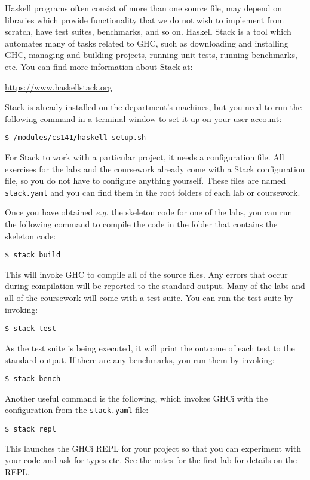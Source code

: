 Haskell programs often consist of more than one source file, may depend on libraries which provide functionality that we do not wish to implement from scratch, have test suites, benchmarks, and so on. Haskell Stack is a tool which automates many of tasks related to GHC, such as downloading and installing GHC, managing and building projects, running unit tests, running benchmarks, etc. You can find more information about Stack at:
\begin{center}
	\url{https://www.haskellstack.org}
\end{center}
Stack is already installed on the department's machines, but you need to run the following command in a terminal window to set it up on your user account:
\begin{verbatim}
$ /modules/cs141/haskell-setup.sh
\end{verbatim}
For Stack to work with a particular project, it needs a configuration file. All exercises for the labs and the coursework already come with a Stack configuration file, so you do not have to configure anything yourself. These files are named \texttt{\small stack.yaml} and you can find them in the root folders of each lab or coursework.

Once you have obtained \emph{e.g.} the skeleton code for one of the labs, you can run the following command to compile the code in the folder that contains the skeleton code:
\begin{verbatim}
$ stack build
\end{verbatim}
This will invoke GHC to compile all of the source files. Any errors that occur during compilation will be reported to the standard output. Many of the labs and all of the coursework will come with a test suite. You can run the test suite by invoking:
\begin{verbatim}
$ stack test
\end{verbatim}
As the test suite is being executed, it will print the outcome of each test to the standard output. If there are any benchmarks, you run them by invoking:
\begin{verbatim}
$ stack bench
\end{verbatim}
Another useful command is the following, which invokes GHCi with the configuration from the \texttt{\small stack.yaml} file:
\begin{verbatim}
$ stack repl
\end{verbatim}
This launches the GHCi REPL for your project so that you can experiment with your code and ask for types etc. See the notes for the first lab for details on the REPL.

